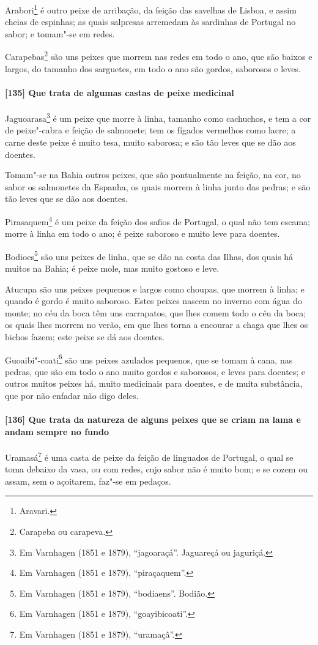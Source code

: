 \begin{linenumbers}
Arabori\footnote{ Aravari.} é outro peixe de arribação, da feição das savelhas de Lisboa,
e assim cheias de espinhas; as quais salpresas arremedam às sardinhas de Portugal no
sabor; e tomam"-se em redes.

Carapebas\footnote{ Carapeba ou carapeva.} são uns peixes que morrem nas redes em todo o
ano, que são baixos e largos, do tamanho dos sarguetes, em todo o ano são gordos,
saborosos e leves.

\paragraph{[135] Que trata de algumas castas de peixe medicinal}\quad
Jaguoarasa\footnote{ Em Varnhagen (1851 e 1879), ``jagoaraçá''. Jaguareçá ou jaguriçá.} é
um peixe que morre à linha, tamanho como cachuchos, e tem a cor de peixe"-cabra e feição de
salmonete; tem os fígados vermelhos como lacre; a carne deste peixe é muito tesa, muito
saborosa; e são tão leves que se dão aos doentes.

Tomam"-se na Bahia outros peixes, que são pontualmente na feição, na cor, no sabor os
salmonetes da Espanha, os quais morrem à linha junto das pedras; e são tão leves que se
dão aos doentes.

Pirasaquem\footnote{ Em Varnhagen (1851 e 1879), ``piraçaquem''.} é um peixe da feição dos
safios de Portugal, o qual não tem escama; morre à linha em todo o ano; é peixe saboroso e
muito leve para doentes.

Bodioes\footnote{ Em Varnhagen (1851 e 1879), ``bodiaens''. Bodião.} são uns peixes de
linha, que se dão na costa das Ilhas, dos quais há muitos na Bahia; é peixe mole, mas
muito gostoso e leve.

Atucupa são uns peixes pequenos e largos como choupas, que morrem à linha; e quando é
gordo é muito saboroso. Estes peixes nascem no inverno com água do monte; no céu da boca
têm uns carrapatos, que lhes comem todo o céu da boca; os quais lhes morrem no verão, em
que lhes torna a encourar a chaga que lhes os bichos fazem; este peixe se dá aos doentes.

Guoaibi"-coati\footnote{ Em Varnhagen (1851 e 1879), ``goayibicoati''.} são uns peixes
azulados pequenos, que se tomam à cana, nas pedras, que são em todo o ano muito gordos e
saborosos, e leves para doentes; e outros muitos peixes há, muito medicinais para doentes,
e de muita substância, que por não enfadar não digo deles.

\paragraph{[136] Que trata da natureza de alguns peixes que se criam na lama e andam sempre
no fundo}\quad
Uramasá\footnote{ Em Varnhagen (1851 e 1879), ``uramaçâ''.} é uma casta de peixe da feição
de linguados de Portugal, o qual se toma debaixo da vasa, ou com redes, cujo sabor não é
muito bom; e se cozem ou assam, sem o açoitarem, faz"-se em pedaços.


\end{linenumbers}

